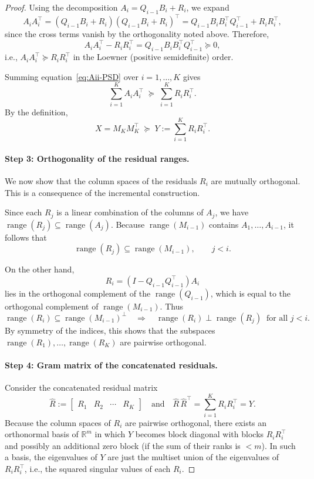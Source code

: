 \documentclass[10pt]{article} %
\def\eqref#1{equation~\ref{#1}}
\begin{document}
\begin{proof}
Using the decomposition $A_i = Q_{i-1}B_i + R_i$, we expand
\[
  A_i A_i^\top
  = (Q_{i-1}B_i + R_i)(Q_{i-1}B_i + R_i)^\top
  = Q_{i-1}B_i B_i^\top Q_{i-1}^\top + R_i R_i^\top,
\]
since the cross terms vanish by the orthogonality noted above. Therefore,
\begin{equation}\label{eq:Aii-PSD}
  A_i A_i^\top - R_i R_i^\top
  = Q_{i-1}B_i B_i^\top Q_{i-1}^\top \succeq 0,
\end{equation}
i.e., $A_iA_i^\top \succeq R_iR_i^\top$ in the Loewner (positive
semidefinite) order.

Summing \eqref{eq:Aii-PSD} over $i=1,\dots,K$ gives
\[
  \sum_{i=1}^K A_i A_i^\top
  \;\succeq\;
  \sum_{i=1}^K R_i R_i^\top.
\]
By the definition,
\begin{equation}\label{eq:X-Y-PSD}
  X = M_K M_K^\top \;\succeq\; Y := \sum_{i=1}^K R_i R_i^\top.
\end{equation}

\paragraph{Step 3: Orthogonality of the residual ranges.}
We now show that the column spaces of the residuals $R_i$ are mutually
orthogonal. This is a consequence of the incremental construction.

Since each \(R_j\) is a linear combination of the columns of \(A_j\), we have
\(\operatorname{range}(R_j) \subseteq \operatorname{range}(A_j)\).
Because \(\operatorname{range}(M_{i-1})\) contains 
\(A_1,\dots,A_{i-1}\), it follows that
\[
  \operatorname{range}(R_j) \subseteq \operatorname{range}(M_{i-1}),
  \qquad j<i.
\]

On the other hand,
\[
  R_i = (I - Q_{i-1}Q_{i-1}^\top)A_i
\]
lies in the orthogonal complement of the $\operatorname{range}(Q_{i-1})$, which
is equal to the orthogonal complement of $\operatorname{range}(M_{i-1})$.
Thus
\[
  \operatorname{range}(R_i) \subseteq \operatorname{range}(M_{i-1})^\perp
  \quad\Rightarrow\quad
  \operatorname{range}(R_i) \perp \operatorname{range}(R_j)
  \;\;\text{for all } j<i.
\]
By symmetry of the indices, this shows that the subspaces
$\operatorname{range}(R_1),\dots,\operatorname{range}(R_K)$ are pairwise
orthogonal.

\paragraph{Step 4: Gram matrix of the concatenated residuals.}
Consider the concatenated residual matrix
\[
  \widehat{R} :=
  \begin{bmatrix}
  R_1 & R_2 & \cdots & R_K
  \end{bmatrix} \quad \text{and} \quad 
  \widehat{R}\,\widehat{R}^\top
  = \sum_{i=1}^K R_i R_i^\top
  = Y.
\]
Because the column spaces of $R_i$ are pairwise orthogonal, there exists an
orthonormal basis of $\mathbb{R}^m$ in which $Y$ becomes block diagonal
with blocks $R_iR_i^\top$ and possibly an additional zero block (if the
sum of their ranks is $<m$). In such a basis, the eigenvalues of $Y$ are
just the multiset union of the eigenvalues of $R_iR_i^\top$, i.e., the
squared singular values of each $R_i$.


\end{proof}
\end{document}
